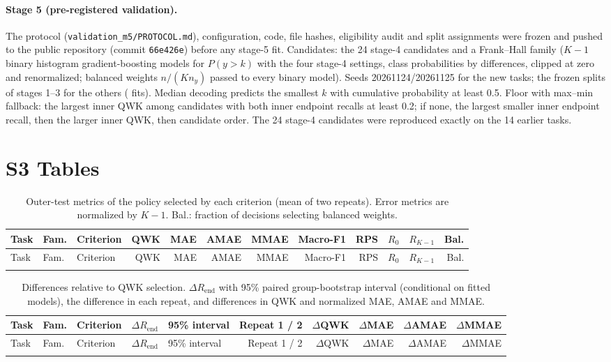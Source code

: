 \documentclass[10pt]{article}
\begin{document}
\paragraph{Stage 5 (pre-registered validation).} The protocol (\texttt{validation\_m5/PROTOCOL.md}), configuration, code, file hashes, eligibility audit and split assignments were frozen and pushed to the public repository (commit \texttt{66e426e}) before any stage-5 fit. Candidates: the 24 stage-4 candidates and a Frank--Hall family ($K-1$ binary histogram gradient-boosting models for $P(y>k)$ with the four stage-4 settings, class probabilities by differences, clipped at zero and renormalized; balanced weights $n/(K n_y)$ passed to every binary model). Seeds 20261124/20261125 for the new tasks; the frozen splits of stages 1--3 for the others (\FitsStageFive{} fits). Median decoding predicts the smallest $k$ with cumulative probability at least 0.5. Floor with max--min fallback: the largest inner QWK among candidates with both inner endpoint recalls at least 0.2; if none, the largest smaller inner endpoint recall, then the larger inner QWK, then candidate order. The 24 stage-4 candidates were reproduced exactly on the 14 earlier tasks.

\section*{S3 Tables}

{\footnotesize
\setlength{\tabcolsep}{3.5pt}
\begin{longtable}{@{}lll*{9}{r}@{}}
\caption{Outer-test metrics of the policy selected by each criterion (mean of two repeats). Error metrics are normalized by $K-1$. Bal.: fraction of decisions selecting balanced weights.}\label{tab:s-policies}\\
\toprule
Task & Fam. & Criterion & QWK & MAE & AMAE & MMAE & Macro-F1 & RPS & $R_0$ & $R_{K-1}$ & Bal.\\
\midrule\endfirsthead
\toprule
Task & Fam. & Criterion & QWK & MAE & AMAE & MMAE & Macro-F1 & RPS & $R_0$ & $R_{K-1}$ & Bal.\\
\midrule\endhead
\bottomrule\endfoot

\end{longtable}
}

{\footnotesize
\setlength{\tabcolsep}{3pt}
\begin{longtable}{@{}lllrlrrrrr@{}}
\caption{Differences relative to QWK selection. $\Delta R_{\mathrm{end}}$ with 95\% paired group-bootstrap interval (conditional on fitted models), the difference in each repeat, and differences in QWK and normalized MAE, AMAE and MMAE.}\label{tab:s-contrasts}\\
\toprule
Task & Fam. & Criterion & $\Delta R_{\mathrm{end}}$ & 95\% interval & Repeat 1 / 2 & $\Delta$QWK & $\Delta$MAE & $\Delta$AMAE & $\Delta$MMAE\\
\midrule\endfirsthead
\toprule
Task & Fam. & Criterion & $\Delta R_{\mathrm{end}}$ & 95\% interval & Repeat 1 / 2 & $\Delta$QWK & $\Delta$MAE & $\Delta$AMAE & $\Delta$MMAE\\
\midrule\endhead
\bottomrule\endfoot

\end{longtable}
}
\end{document}
